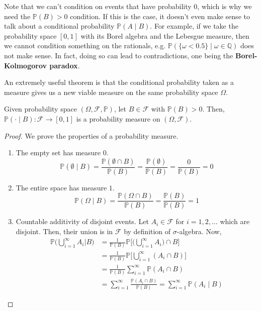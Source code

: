     Note that we can't condition on events that have probability $0$, which is why we need the $\mathbb{P}(B) > 0$ condition. If this is the case, it doesn't even make sense to talk about a conditional probability $\mathbb{P}(A \mid B)$. For example, if we take the probability space $[0, 1]$ with its Borel algebra and the Lebesgue measure, then we cannot condition something on the rationals, e.g. $\mathbb{P}(\{\omega < 0.5\} \mid \omega \in \mathbb{Q})$ does not make sense. In fact, doing so can lead to contradictions, one being the \textbf{Borel-Kolmogorov paradox}. 

    An extremely useful theorem is that the conditional probability taken as a measure gives us a new viable measure on the same probability space $\Omega$. 

    \begin{theorem}
      Given probability space $(\Omega, \mathcal{F}, \mathbb{P})$, let $B \in \mathcal{F}$ with $\mathbb{P}(B) > 0$. Then, $\mathbb{P}( \cdot \mid B): \mathcal{F} \longrightarrow [0, 1]$ is a probability measure on $(\Omega, \mathcal{F})$. 
    \end{theorem}
    \begin{proof}
      We prove the properties of a probability measure. 
      \begin{enumerate}
        \item The empty set has measure $0$. 
        \begin{equation}
          \mathbb{P}(\emptyset \mid B) = \frac{\mathbb{P}( \emptyset \cap B)}{\mathbb{P}(B)} = \frac{\mathbb{P}(\emptyset)}{\mathbb{P}(B)} = \frac{0}{\mathbb{P}(B)} = 0
        \end{equation}
        \item The entire space has measure $1$. 
        \begin{equation}
          \mathbb{P}(\Omega \mid B) =  \frac{\mathbb{P}( \Omega \cap B)}{\mathbb{P}(B)} = \frac{\mathbb{P}(B)}{\mathbb{P}(B)} = 1
        \end{equation}
        \item Countable additivity of disjoint events. Let $A_i \in \mathcal{F}$ for $i = 1, 2, \ldots$ which are disjoint. Then, their union is in $\mathcal{F}$ by definition of $\sigma$-algebra. Now, 
        \begin{align*}
          \mathbb{P}\bigg( \bigcup_{i=1}^\infty A_i \bigg| B \bigg) & = \frac{1}{\mathbb{P}(B)} \mathbb{P} \bigg[ \Big( \bigcup_{i=1}^\infty A_i \Big) \cap B \bigg] \\
          & = \frac{1}{\mathbb{P}(B)} \mathbb{P} \bigg[ \bigcup_{i=1}^\infty (A_i \cap B) \bigg] \\
          & = \frac{1}{\mathbb{P}(B)} \sum_{i=1}^\infty \mathbb{P} (A_i \cap B) \\
          & = \sum_{i=1}^\infty \frac{\mathbb{P} (A_i \cap B)}{\mathbb{P}(B)} = \sum_{i=1}^\infty \mathbb{P}(A_i \mid B) 
        \end{align*}
      \end{enumerate}
    \end{proof}

